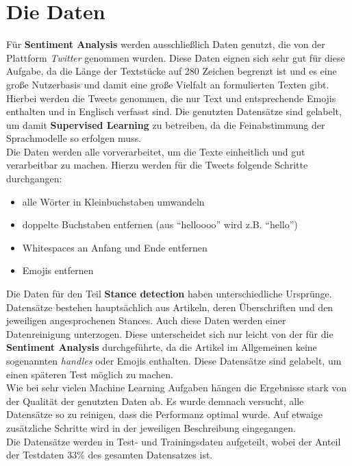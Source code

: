 \section{Die Daten}
F\"ur \textbf{Sentiment Analysis} werden ausschlie{\ss}lich Daten genutzt, die von der Plattform \textit{Twitter} genommen wurden. Diese Daten eignen sich sehr gut f\"ur diese Aufgabe, da die L\"ange der Textst\"ucke auf 280 Zeichen begrenzt ist \cite{twitter} und es eine gro{\ss}e Nutzerbasis und damit eine gro{\ss}e Vielfalt an formulierten Texten gibt. Hierbei werden die Tweets genommen, die nur Text und entsprechende Emojis enthalten und in Englisch verfasst sind. Die genutzten Datens\"atze sind gelabelt, um damit \textbf{Supervised Learning} zu betreiben, da die Feinabstimmung der Sprachmodelle so erfolgen muss.\\
Die Daten werden alle vorverarbeitet, um die Texte einheitlich und gut verarbeitbar zu machen. Hierzu werden f\"ur die Tweets folgende Schritte durchgangen:
\begin{itemize}
\item alle W\"orter in Kleinbuchstaben umwandeln
\item doppelte Buchstaben entfernen (aus "`helloooo"' wird z.B. "`hello"') 
\item Whitespaces an Anfang und Ende entfernen
\item Emojis entfernen
\end{itemize}
Die Daten f\"ur den Teil \textbf{Stance detection} haben unterschiedliche Urspr\"unge. Datens\"atze bestehen haupts\"achlich aus Artikeln, deren \"Uberschriften und den jeweiligen angesprochenen Stances. Auch diese Daten werden einer Datenreinigung unterzogen. Diese unterscheidet sich nur leicht von der f\"ur die \textbf{Sentiment Analysis} durchgef\"uhrte, da die Artikel im Allgemeinen keine sogenannten \textit{handles} oder Emojis enthalten. Diese Datens\"atze sind gelabelt, um einen sp\"ateren Test m\"oglich zu machen.\\
Wie bei sehr vielen Machine Learning Aufgaben h\"angen die Ergebnisse stark von der Qualit\"at der genutzten Daten ab. Es wurde demnach versucht, alle Datens\"atze so zu reinigen, dass die Performanz optimal wurde. Auf etwaige zus\"atzliche Schritte wird in der jeweiligen Beschreibung eingegangen.\\
Die Datens\"atze werden in Test- und Trainingsdaten aufgeteilt, wobei der Anteil der Testdaten 33\% des gesamten Datensatzes ist.


